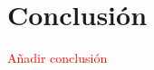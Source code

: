 \chapter*{Conclusión}


\textcolor{red}{Añadir conclusión}

\begin{comment}
    Las conclusiones deberán incluir todas aquellas de tipo profesional y académico.
    Además, se deberá indicar si los objetivos han sido alcanzados totalmente, parcialmente o no alcanzados.
    Si hubiese posibles vías claras de desarrollo posterior sería interesante destacarlas aquí, poniéndolas en valor en el contexto inicial del trabajo.
\end{comment}
